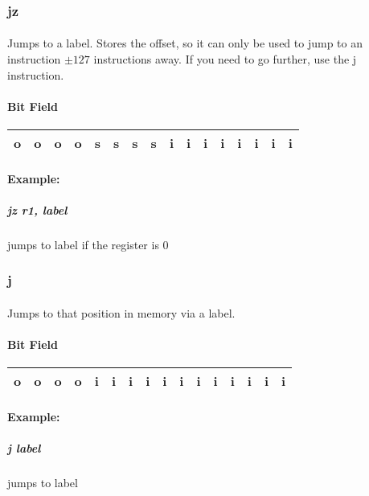 \documentclass[a4paper]{article}
\begin{document}
\subsubsection{jz}
\paragraph{} Jumps to a label. Stores the offset, so it can only be used to jump to an instruction $\pm 127$ instructions away. If you need to go further, use the j instruction.

\paragraph{Bit Field}
\begin{center}
\begin{tabular}{| c | c | c | c | c | c | c | c | c | c | c | c | c | c | c | c |}
\hline
o&o&o&o&s&s&s&s&i&i&i&i&i&i&i&i\\ \hline
\end{tabular}
\end{center}

\paragraph{Example:}
\subparagraph{jz r1, label} jumps to label if the register is 0


\subsubsection{j}
\paragraph{} Jumps to that position in memory via a label.
\paragraph{Bit Field}
\begin{center}
\begin{tabular}{| c | c | c | c | c | c | c | c | c | c | c | c | c | c | c | c |}
\hline
o&o&o&o&i&i&i&i&i&i&i&i&i&i&i&i\\ \hline
\end{tabular}
\end{center}

\paragraph{Example:}
\subparagraph{j label} jumps to label
\end{document}

